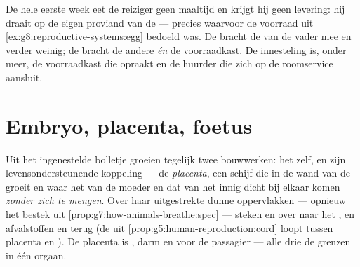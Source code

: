 \begin{example}\label{ex:g8:from-egg-to-birth:provisions}
De hele eerste week eet de reiziger geen maaltijd en krijgt hij geen
levering: hij draait op de eigen proviand van de  --- precies
waarvoor de voorraad uit \cref{ex:g8:reproductive-systems:egg} bedoeld
was. De  bracht de  van de vader mee en verder weinig; de
 bracht de andere  \emph{én} de voorraadkast. De innesteling
is, onder meer, de voorraadkast die opraakt en de huurder die zich op de
roomservice aansluit.
\end{example}

\section{Embryo, placenta, foetus}

\begin{definition}[De placenta]\label{def:g8:from-egg-to-birth:placenta}
Uit het ingenestelde bolletje groeien tegelijk twee bouwwerken: het
\emph{} zelf, en zijn levensondersteunende koppeling --- de
\emph{placenta}, een schijf die in de wand van de
 groeit en waar het  van de moeder en dat van het 
innig dicht bij elkaar komen \emph{zonder zich te mengen}. Over haar
uitgestrekte dunne oppervlakken --- opnieuw het bestek uit
\cref{prop:g7:how-animals-breathe:spec} --- steken  en
 over naar het , en afvalstoffen en  terug
(de  uit \cref{prop:g5:human-reproduction:cord} loopt tussen
placenta en ). De placenta is , darm en  voor de passagier
--- alle drie de grenzen in één orgaan.
\end{definition}

